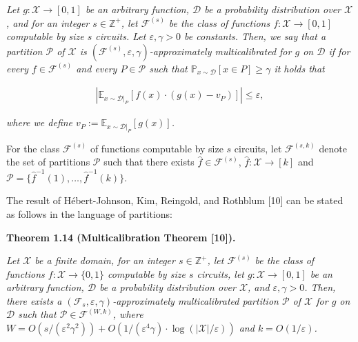\documentclass[10pt,a4paper]{article}
\begin{document}
\emph{Let $g:\mathcal{X}\rightarrow[0,1]$ be an arbitrary function, $\mathcal{D}$ be a probability distribution over $\mathcal{X}$, and for an integer $s\in\mathbb{Z}^{+}$, let $\mathcal{F}^{(s)}$ be the class of functions $f:\mathcal{X}\rightarrow[0,1]$ computable by size $s$ circuits. Let $\varepsilon,\gamma>0$ be constants. Then, we say that a partition $\mathcal{P}$ of $\mathcal{X}$ is $(\mathcal{F}^{(s)},\varepsilon,\gamma)$-approximately multicalibrated for $g$ on $\mathcal{D}$ if for every $f\in\mathcal{F}^{(s)}$ and every $P\in\mathcal{P}$ such that $\mathbb{P}_{x\sim\mathcal{D}}[x\in P]\geq\gamma$ it holds that}\par


\[\begin{gathered}
\left|\mathbb{E}_{x\sim\mathcal{D}|_{P}}[f(x)\cdot(g(x)-v_{P})]\right|\leq\varepsilon,
\end{gathered}\]


\emph{where we define $v_{P}:=\mathbb{E}_{x\sim\mathcal{D}|_{P}}[g(x)]$.}\par






For the class $\mathcal{F}^{(s)}$ of functions computable by size $s$ circuits, let $\mathcal{F}^{(s,k)}$ denote the set of partitions $\mathcal{P}$ such that there exists $\hat{f}\in\mathcal{F}^{(s)}$, $\hat{f}:\mathcal{X}\rightarrow[k]$ and $\mathcal{P}=\{\hat{f}^{-1}(1),\dots,\hat{f}^{-1}(k)\}$.\par




The result of Hébert-Johnson, Kim, Reingold, and Rothblum [10] can be stated as follows in the language of partitions:\par





\par\medskip\noindent\textbf{
\textbf{Theorem 1.14}\textbf{ }(Multicalibration Theorem [10])\textbf{.}
}\par



\emph{Let $\mathcal{X}$ be a finite domain, for an integer $s\in\mathbb{Z}^{+}$, let $\mathcal{F}^{(s)}$ be the class of functions $f:\mathcal{X}\rightarrow\{0,1\}$ computable by size $s$ circuits, let $g:\mathcal{X}\rightarrow[0,1]$ be an arbitrary function, $\mathcal{D}$ be a probability distribution over $\mathcal{X}$, and $\varepsilon,\gamma>0$. Then, there exists a $(\mathcal{F}_{s},\varepsilon,\gamma)$-approximately multicalibrated partition $\mathcal{P}$ of $\mathcal{X}$ for $g$ on $\mathcal{D}$ such that $\mathcal{P}\in\mathcal{F}^{(W,k)}$, where $W=O(s/(\varepsilon^{2}\gamma^{2}))+O(1/(\varepsilon^{4}\gamma)\cdot\log(|\mathcal{X}|/\varepsilon))$ and $k=O(1/\varepsilon)$.}\par
\end{document}
